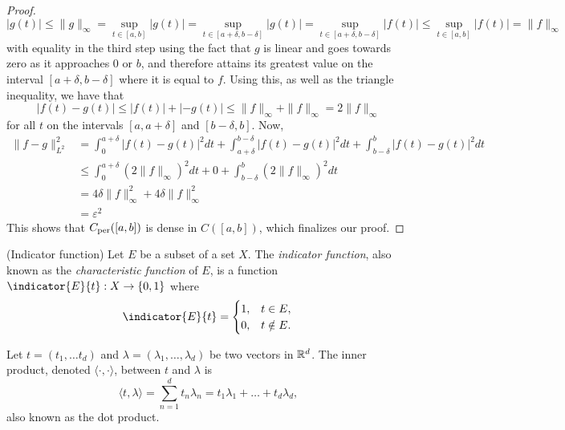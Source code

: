 \documentclass[../thesis.tex]{subfiles}
\begin{document}
\begin{proof}
\begin{equation*}
        |g(t)| \leq \|g\|_{\infty} = \sup_{t\in[a,b]} |g(t)| = \sup_{t\in[a+\delta, b-\delta]} |g(t)| = \sup_{t\in[a+\delta, b-\delta]} |f(t)| \leq \sup_{t\in[a, b]} |f(t)| =\| f\|_{\infty}
    \end{equation*}
    with equality in the third step using the fact that $g$ is linear and goes towards zero as it approaches $0$ or $b$, and therefore attains its greatest value on the interval $[a+\delta,b-\delta]$ where it is equal to $f$. Using this, as well as the triangle inequality, we have that
    \begin{equation*}
        \left|f(t)-g(t) \right| \leq |f(t)| + |-g(t)| \leq \|f \|_{\infty} + \|f \|_{\infty} = 2 \|f \|_{\infty}
    \end{equation*}
    for all $t$ on the intervals $[a, a+\delta]$ and $[b-\delta,b]$. Now,
    \begin{align*}
        \| f-g \|_{L^2}^2 &=  \int_0^{a+\delta} \left|f(t)-g(t) \right|^2dt + \int_{a+\delta}^{b-\delta} \left|f(t)-g(t) \right|^2dt +\int_{b-\delta}^{b} \left|f(t)-g(t) \right|^2dt\\ 
        &\leq \int_0^{a+\delta} (2 \| f\|_\infty)^2dt + 0 +\int_{b-\delta}^{b} (2 \| f\|_\infty)^2dt\\
        &=  4 \delta \| f\|_\infty^2 + 4 \delta \| f\|_\infty^2\\ 
        &= \varepsilon^2
    \end{align*}
    This shows that $C_{\text{per}}([a,b])$ is dense in $C([a,b])$, which finalizes our proof.
\end{proof}

\begin{definition}(Indicator function)\label{def:indicator}
    Let $E$ be a subset of a set $X$. The \emph{indicator function}, also known as the \emph{characteristic function} of $E$, is a function $\indicator{E}{t}: X \rightarrow \braq{0,1}$ where
    \begin{equation*}
        \indicator{E}{t}  = 
        \begin{cases} 
            1, &  t\in E,\\
            0, &  t \notin E.
        \end{cases}
        \qedhere
    \end{equation*}
\end{definition}


\begin{definition}\label{def:dot_prod}
    Let $t=(t_1,\dots t_d)$ and $\lambda=(\lambda_1, \dots, \lambda_d)$ be two vectors in $\mathbb{R}^d$. The inner product, denoted $\langle \cdot, \cdot \rangle$, between $t$ and $\lambda$ is
    \begin{equation*}
        \langle t, \lambda \rangle = \sum_{n=1}^d t_n \lambda_n = t_1\lambda_1 + \dots + t_d\lambda_d,
    \end{equation*}
    also known as the dot product. 
\end{definition}
\end{document}
